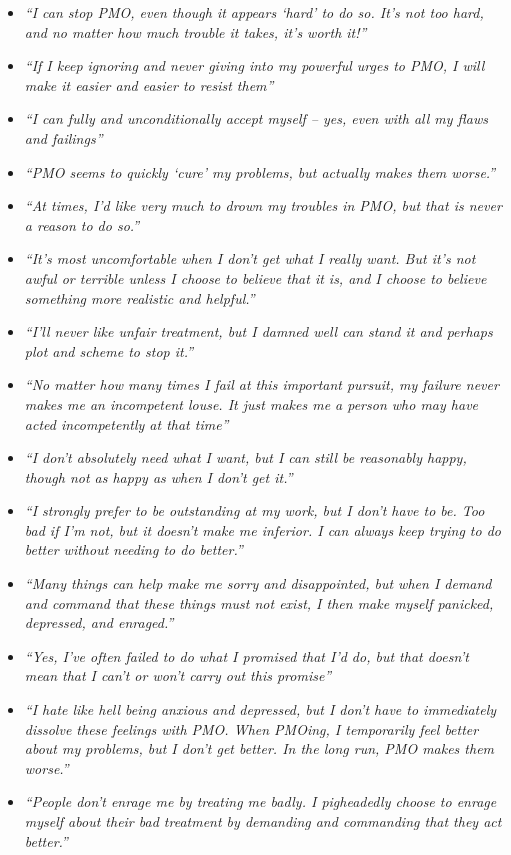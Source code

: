\documentclass[
]{book}
\begin{document}
\begin{itemize}
\item
  \emph{``I can stop PMO, even though it appears `hard' to do so. It's not too hard, and no matter how much trouble it takes, it's worth it!''}
\item
  \emph{``If I keep ignoring and never giving into my powerful urges to PMO, I will make it easier and easier to resist them''}
\item
  \emph{``I can fully and unconditionally accept myself -- yes, even with all my flaws and failings''}
\item
  \emph{``PMO seems to quickly `cure' my problems, but actually makes them worse.''}
\item
  \emph{``At times, I'd like very much to drown my troubles in PMO, but that is never a reason to do so.''}
\item
  \emph{``It's most uncomfortable when I don't get what I really want. But it's not awful or terrible unless I choose to believe that it is, and I choose to believe something more realistic and helpful.''}
\item
  \emph{``I'll never like unfair treatment, but I damned well can stand it and perhaps plot and scheme to stop it.''}
\item
  \emph{``No matter how many times I fail at this important pursuit, my failure never makes me an incompetent louse. It just makes me a person who may have acted incompetently at that time''}
\item
  \emph{``I don't absolutely need what I want, but I can still be reasonably happy, though not as happy as when I don't get it.''}
\item
  \emph{``I strongly prefer to be outstanding at my work, but I don't have to be. Too bad if I'm not, but it doesn't make me inferior. I can always keep trying to do better without needing to do better.''}
\item
  \emph{``Many things can help make me sorry and disappointed, but when I demand and command that these things must not exist, I then make myself panicked, depressed, and enraged.''}
\item
  \emph{``Yes, I've often failed to do what I promised that I'd do, but that doesn't mean that I can't or won't carry out this promise''}
\item
  \emph{``I hate like hell being anxious and depressed, but I don't have to immediately dissolve these feelings with PMO. When PMOing, I temporarily feel better about my problems, but I don't get better. In the long run, PMO makes them worse.''}
\item
  \emph{``People don't enrage me by treating me badly. I pigheadedly choose to enrage myself about their bad treatment by demanding and commanding that they act better.''}
\end{itemize}
\end{document}
